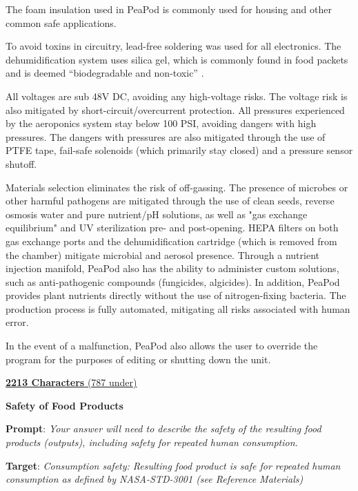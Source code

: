 \documentclass{report}
\begin{document}
The foam insulation used in PeaPod is commonly used for housing and other common safe applications. 

To avoid toxins in circuitry, lead-free soldering was used for all electronics. The dehumidification system uses silica gel, which is commonly found in food packets and is deemed “biodegradable and non-toxic” \cite{silica}.

All voltages are sub 48V DC, avoiding any high-voltage risks. The voltage risk is also mitigated by short-circuit/overcurrent protection. 
All pressures experienced by the aeroponics system stay below 100 PSI, avoiding dangers with high pressures. The dangers with pressures are also mitigated through the use of PTFE tape, fail-safe solenoids (which primarily stay closed) and a pressure sensor shutoff. 

Materials selection eliminates the risk of off-gassing. The presence of microbes or other harmful pathogens are mitigated through the use of clean seeds, reverse osmosis water and pure nutrient/pH solutions, as well as "gas exchange equilibrium" and UV sterilization pre- and post-opening. HEPA filters on both gas exchange ports and the dehumidification cartridge (which is removed from the chamber) mitigate microbial and aerosol presence. Through a nutrient injection manifold, PeaPod also has the ability to administer custom solutions, such as anti-pathogenic compounds (fungicides, algicides).
In addition, PeaPod provides plant nutrients directly without the use of nitrogen-fixing bacteria. The production process is fully automated, mitigating all risks associated with human error. 

In the event of a malfunction, PeaPod also allows the user to override the program for the purposes of editing or shutting down the unit.

\uline{\textbf{2213 Characters} (787 under)}

\vspace{0.5cm}

\textbf{Safety of Food Products}
\label{sec:safety-products}

\textbf{Prompt}: \textit{Your answer will need to describe the safety of the resulting food products (outputs), including safety for repeated human consumption.}

\textbf{Target}: \textit{Consumption safety: Resulting food product is safe for repeated human consumption as defined by NASA-STD-3001 (see Reference Materials)}

\end{document}
